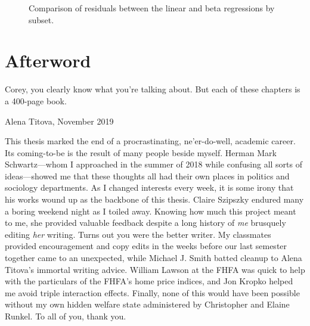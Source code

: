 \documentclass[12pt,oneside]{psthesis}
\begin{document}
\begin{figure}

{\centering {}\newline{}

}

\caption{Comparison of residuals between the linear and beta regressions by subset.}\label{fig:resids}
\end{figure}

\hypertarget{afterword}{%
\chapter*{Afterword}\label{afterword}}

\epigraph{Corey, you clearly know what you're talking about. But each of these chapters is a 400-page book.}{Alena Titova, November 2019}

This thesis marked the end of a procrastinating, ne'er-do-well, academic career.
Its coming-to-be is the result of many people beside myself.
Herman Mark Schwartz---whom I approached in the summer of 2018 while confusing all sorts of ideas---showed me that these thoughts all had their own places in politics and sociology departments.
As I changed interests every week, it is some irony that his works wound up as the backbone of this thesis.
Claire Szipszky endured many a boring weekend night as I toiled away.
Knowing how much this project meant to me, she provided valuable feedback despite a long history of \emph{me} brusquely editing \emph{her} writing.
Turns out you were the better writer.
My classmates provided encouragement and copy edits in the weeks before our last semester together came to an unexpected, while Michael J. Smith batted cleanup to Alena Titova's immortal writing advice.
William Lawson at the FHFA was quick to help with the particulars of the FHFA's home price indices, and Jon Kropko helped me avoid triple interaction effects.
Finally, none of this would have been possible without my own hidden welfare state administered by Christopher and Elaine Runkel.
To all of you, thank you.
\end{document}
